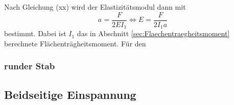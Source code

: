 Nach Gleichung (xx) wird der Elastizitätsmodul dann mit
\begin{equation}
  a = \frac{F}{2 E I_1} \iff E = \frac{F}{2 I_1 a}
  \label{eqn:Emodul1}
\end{equation}
bestimmt. Dabei ist $I_1$ das in Abschnitt \ref{sec:Flaechentraegheitsmoment}
berechnete Flächenträgheitsmoment. Für den

\subsubsection{runder Stab}


\subsection{Beidseitige Einspannung}
